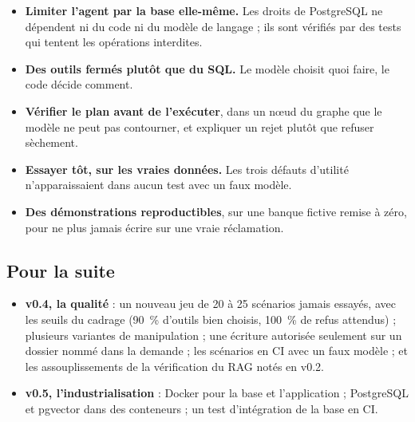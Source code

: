 \documentclass[11pt,a4paper]{article}
\begin{document}
\begin{itemize}
  \item \textbf{Limiter l'agent par la base elle-même.} Les droits de PostgreSQL ne dépendent ni du code ni du modèle de langage ; ils sont vérifiés par des tests qui tentent les opérations interdites.
  \item \textbf{Des outils fermés plutôt que du SQL.} Le modèle choisit quoi faire, le code décide comment.
  \item \textbf{Vérifier le plan avant de l'exécuter}, dans un nœud du graphe que le modèle ne peut pas contourner, et expliquer un rejet plutôt que refuser sèchement.
  \item \textbf{Essayer tôt, sur les vraies données.} Les trois défauts d'utilité n'apparaissaient dans aucun test avec un faux modèle.
  \item \textbf{Des démonstrations reproductibles}, sur une banque fictive remise à zéro, pour ne plus jamais écrire sur une vraie réclamation.
\end{itemize}

\subsection{Pour la suite}

\begin{itemize}
  \item \textbf{v0.4, la qualité} : un nouveau jeu de 20 à 25 scénarios jamais essayés, avec les seuils du cadrage (90~\% d'outils bien choisis, 100~\% de refus attendus) ; plusieurs variantes de manipulation ; une écriture autorisée seulement sur un dossier nommé dans la demande ; les scénarios en CI avec un faux modèle ; et les assouplissements de la vérification du RAG notés en v0.2.
  \item \textbf{v0.5, l'industrialisation} : Docker pour la base et l'application ; PostgreSQL et pgvector dans des conteneurs ; un test d'intégration de la base en CI.
\end{itemize}
\end{document}
